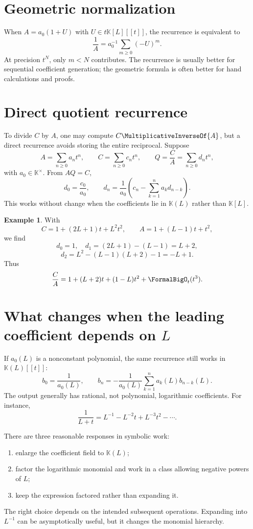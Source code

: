 \documentclass[11pt,openany]{book}
\theoremstyle{definition}
\newtheorem{example}{Example}[chapter]
\theoremstyle{plain}
\theoremstyle{remark}
\newcommand{\K}{\mathbb{K}}
\newcommand{\recip}[1]{\MultiplicativeInverseOf{#1}}
\begin{document}
\section{Geometric normalization}
When \(A=a_0(1+U)\) with \(U\in t\K[L][[t]]\), the recurrence is equivalent to
\begin{equation}\label{eq:geometric-recip}
 \frac1A=a_0^{-1}\sum_{m\ge0}(-U)^m.
\end{equation}
At precision \(t^N\), only \(m<N\) contributes.  The recurrence is usually
better for sequential coefficient generation; the geometric formula is often
better for hand calculations and proofs.

\section{Direct quotient recurrence}
To divide \(C\) by \(A\), one may compute \(C\recip{A}\), but a direct
recurrence avoids storing the entire reciprocal.  Suppose
\[
 A=\sum_{n\ge0}a_nt^n,
 \qquad
 C=\sum_{n\ge0}c_nt^n,
 \qquad
 Q=\frac CA=\sum_{n\ge0}d_nt^n,
\]
with \(a_0\in\K^\times\).  From \(AQ=C\),
\begin{equation}\label{eq:quotient-recurrence}
 d_0=\frac{c_0}{a_0},
 \qquad
 d_n=\frac1{a_0}
 \left(c_n-\sum_{k=1}^n a_kd_{n-k}\right).
\end{equation}
This works without change when the coefficients lie in \(\K(L)\) rather than
\(\K[L]\).

\begin{example}
With
\[
 C=1+(2L+1)t+L^2t^2,
 \qquad
 A=1+(L-1)t+t^2,
\]
we find
\[
 d_0=1,
 \quad
 d_1=(2L+1)-(L-1)=L+2,
\]
\[
 d_2=L^2-(L-1)(L+2)-1=-L+1.
\]
Thus
\[
 \frac CA=1+(L+2)t+(1-L)t^2+\FormalBigO_t(t^3).
\]
\end{example}

\section{What changes when the leading coefficient depends on \texorpdfstring{\(L\)}{L}}
If \(a_0(L)\) is a nonconstant polynomial, the same recurrence still works in
\(\K(L)[[t]]\):
\[
 b_0=\frac1{a_0(L)},
 \qquad
 b_n=-\frac1{a_0(L)}\sum_{k=1}^na_k(L)b_{n-k}(L).
\]
The output generally has rational, not polynomial, logarithmic coefficients.
For instance,
\[
 \frac1{L+t}=L^{-1}-L^{-2}t+L^{-3}t^2-\cdots.
\]

There are three reasonable responses in symbolic work:
\begin{enumerate}
\item enlarge the coefficient field to \(\K(L)\);
\item factor the logarithmic monomial and work in a class allowing negative
powers of \(L\);
\item keep the expression factored rather than expanding it.
\end{enumerate}
The right choice depends on the intended subsequent operations.  Expanding into
\(L^{-1}\) can be asymptotically useful, but it changes the monomial hierarchy.
\end{document}
